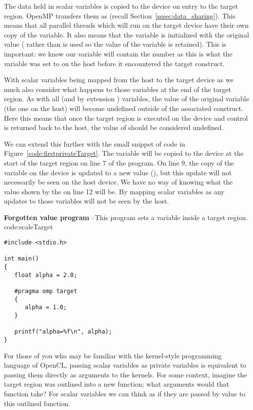 The data held in scalar variables is copied to the device on entry to the target region.
OpenMP transfers them as  (recall Section~\ref{sssec:data_sharing}).
This means that all parallel threads which will run on the target device have their own copy of the variable.
It also means that the variable is initialized with the original value ( rather than  is used so the value of the variable is retained).
This is important: we know our  variable will contain the number  as this is what the variable was set to on the host before it encountered the target construct.

With scalar variables being mapped from the host to the target device as  we much also consider what happens to those variables at the end of the target region.
As with all  (and by extension ) variables, the value of the original variable (the one on the host) will become undefined outside of the associated construct.
Here this means that once the target region is executed on the device and control is returned back to the host, the value of  should be considered undefined.

We can extend this further with the small snippet of code in Figure~\ref{code:firstprivateTarget}.
The  variable will be copied to the device at the start of the target region on line 7 of the program.
On line 9, the copy of the variable on the device is updated to a new value (), but this update will not necessarily be seen on the host device.
We have no way of knowing what the value shown by the  on line 12 will be.
By mapping scalar variables as  any updates to those variables will not be seen by the host.

\begin{CodeExample}%
{\textbf{Forgotten value program} --\small This program sets a  variable
inside a target region.
}%
{code:scaleTarget}
\begin{lstlisting}
#include <stdio.h>

int main()
{
   float alpha = 2.0;

   #pragma omp target
   {
      alpha = 1.0;
   }

   printf("alpha=%f\n", alpha);
}	  
\end{lstlisting}
\end{CodeExample}

For those of you who may be familiar with the kernel-style programming language of OpenCL, passing scalar variables as private variables is equivalent to passing them directly as arguments to the kernels.
For some context, imagine the target region was outlined into a new function; what arguments would that function take?
For scalar variables we can think as if they are passed by value to this outlined function.


